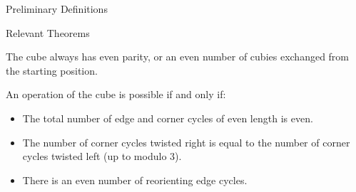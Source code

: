 \documentclass[final]{beamer}
\newlength{\colwidth}
\begin{document}
\begin{frame}[t]
\begin{columns}[t]
\begin{column}{\colwidth}
\begin{alertblock}{Preliminary Definitions}

  \end{alertblock}

  \begin{block}{Relevant Theorems}

The cube always has even parity, or an even number of cubies
exchanged from the starting position.

      An operation of the cube is possible if and only if:
            \begin{itemize}
              \item The total number of edge and corner cycles of even length is even.
              \item The number of corner cycles twisted right is equal to the number of corner cycles twisted left (up to modulo $3$).
              \item There is an even number of reorienting edge cycles.








    \end{itemize}

  \end{block}



\end{column}


\end{columns}
\end{frame}
\end{document}
